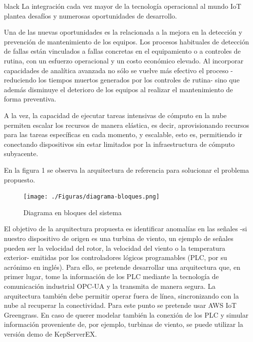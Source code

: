 \documentclass[11pt]{charter}
\begin{document}
\begin{consigna}{black}
La integración cada vez mayor de la tecnología operacional al mundo IoT plantea desafíos y numerosas oportunidades de desarrollo. 

Una de las nuevas oportunidades es la relacionada a la mejora en la detección y prevención de mantenimiento de los equipos. Los procesos habituales de detección de fallas están vinculados a fallas concretas en el equipamiento o a controles de rutina, con un esfuerzo operacional y un costo económico elevado. Al incorporar capacidades de analítica avanzada no sólo se vuelve más efectivo el proceso -reduciendo los tiempos muertos generados por los controles de rutina- sino que además disminuye el deterioro de los equipos al realizar el mantenimiento de forma preventiva. 

A la vez, la capacidad de ejecutar tareas intensivas de cómputo en la nube permiten escalar los recursos de manera elástica, es decir, aprovisionando recursos para las tareas específicas en cada momento, y escalable, esto es, permitiendo ir conectando dispositivos sin estar limitados por la infraestructura de cómputo subyacente.

En la figura 1 se observa la arquitectura de referencia para solucionar el problema propuesto.


\vspace{25px}

\begin{figure}[htpb]
\centering 
\texttt{[image: ./Figuras/diagrama-bloques.png]}
\caption{Diagrama en bloques del sistema}
\label{fig:diagBloques}
\end{figure}


\vspace{25px}

El objetivo de la arquitectura propuesta es identificar anomalías en las señales -si nuestro dispositivo de origen es una turbina de viento, un ejemplo de señales pueden ser la velocidad del rotor, la velocidad del viento o la temperatura exterior- emitidas por los controladores lógicos programables (PLC, por su acrónimo en inglés). Para ello, se pretende desarrollar una arquitectura que, en primer lugar, tome la información de los PLC mediante la tecnología de comunicación industrial OPC-UA y la transmita de manera segura. La arquitectura también debe permitir operar fuera de línea, sincronizando con la nube al recuperar la conectividad. Para este punto se pretende usar AWS IoT Greengrass. En caso de querer modelar también la conexión de los PLC y simular información proveniente de, por ejemplo, turbinas de viento, se puede utilizar la versión demo de KepServerEX. 


\end{consigna}
\end{document}

